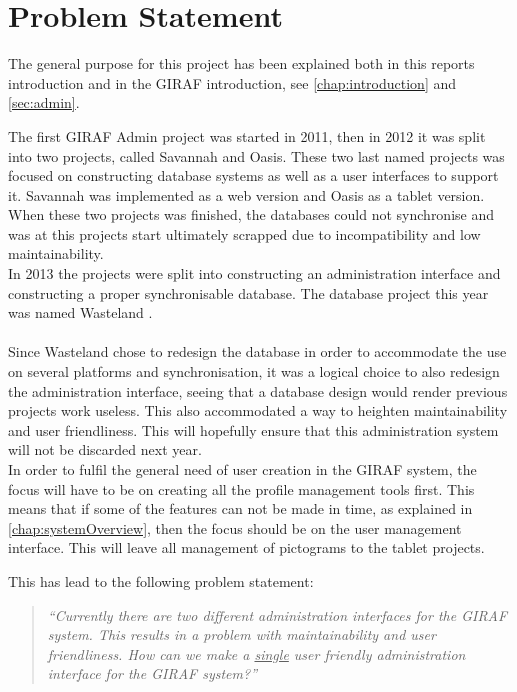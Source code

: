 \chapter{Problem Statement}
\label{chap:problemStatment}
The general purpose for this project has been explained both in this reports introduction and in the GIRAF introduction, see \ref{chap:introduction} and \ref{sec:admin}.

The first GIRAF Admin project was started in 2011, then in 2012 it was split into two projects, called Savannah and Oasis. These two last named projects was focused on constructing database systems as well as a user interfaces to support it. Savannah was implemented as a web version and Oasis as a tablet version. When these two projects was finished, the databases could not synchronise and was at this projects start ultimately scrapped due to incompatibility and low maintainability.\\
In 2013 the projects were split into constructing an administration interface and constructing a proper synchronisable database. The database project this year was named Wasteland \citep{wasteland}.\\
\\

Since Wasteland chose to redesign the database in order to accommodate the use on several platforms and synchronisation, it was a logical choice to also redesign the administration interface, seeing that a database design would render previous projects work useless. This also accommodated a way to heighten maintainability and user friendliness. This will hopefully ensure that this administration system will not be discarded next year.\\
In order to fulfil the general need of user creation in the GIRAF system, the focus will have to be on creating all the profile management tools first. This means that if some of the features can not be made in time, as explained in \vref{chap:systemOverview}, then the focus should be on the user management interface. This will leave all management of pictograms to the tablet projects.

This has lead to the following problem statement:
\begin{verse}
\textit{``Currently there are two different administration interfaces for the GIRAF system.
This results in a problem with maintainability and user friendliness.
How can we make a \underline{single} user friendly administration interface for the GIRAF system?''}
\end{verse}
